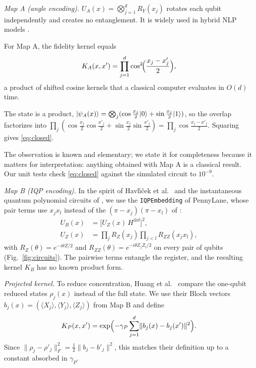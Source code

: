 \emph{Map A (angle encoding).} $U_A(x)=\bigotimes_{j=1}^{d}R_Y(x_j)$ rotates each qubit independently
and creates no entanglement. It is widely used in hybrid NLP models \cite{vats2025survey}.

\begin{proposition}
\label{prop:angle}
For Map A, the fidelity kernel equals
\begin{equation}
K_A(x,x') = \prod_{j=1}^{d}\cos^2\!\Bigl(\frac{x_j-x'_j}{2}\Bigr),
\label{eq:closed}
\end{equation}
a product of shifted cosine kernels that a classical computer evaluates in $O(d)$ time.
\end{proposition}
\begin{paperproof}
The state is a product, $\lvert \psi_A(x) \rangle=\bigotimes_j(\cos\frac{x_j}{2}\lvert 0 \rangle+\sin\frac{x_j}{2}\lvert 1 \rangle)$, so the
overlap factorizes into $\prod_j(\cos\frac{x_j}{2}\cos\frac{x'_j}{2}+\sin\frac{x_j}{2}\sin\frac{x'_j}{2})
=\prod_j\cos\frac{x_j-x'_j}{2}$. Squaring gives \eqref{eq:closed}.
\end{paperproof}

The observation is known and elementary; we state it for completeness because it matters for
interpretation: anything obtained with Map A is a classical result. Our unit tests check
\eqref{eq:closed} against the simulated circuit to $10^{-9}$.

\emph{Map B (IQP encoding).} In the spirit of Havl\'{\i}\v{c}ek et al.~\cite{havlicek2019supervised} and the
instantaneous quantum polynomial circuits of \cite{shepherd2009temporally}, we use the
\texttt{IQPEmbedding} of PennyLane, whose pair terms use $x_jx_l$ instead of the
$(\pi-x_j)(\pi-x_l)$ of \cite{havlicek2019supervised}:
\begin{equation}
\begin{aligned}
U_B(x)&=\bigl[U_Z(x)\,H^{\otimes d}\bigr]^{2},\\
U_Z(x)&=\prod_{j}R_Z(x_j)\prod_{j<l}R_{ZZ}(x_jx_l),
\end{aligned}
\label{eq:iqp}
\end{equation}
with $R_Z(\theta)=e^{-i\theta Z/2}$ and $R_{ZZ}(\theta)=e^{-i\theta Z_jZ_l/2}$ on every pair of qubits
(Fig.~\ref{fig:circuits}). The pairwise terms entangle the register, and the resulting kernel $K_B$ has
no known product form.

\emph{Projected kernel.} To reduce concentration, Huang et al.~\cite{huang2021power} compare the
one-qubit reduced states $\rho_j(x)$ instead of the full state. We use their Bloch vectors
$b_j(x)=(\langle X_j\rangle,\langle Y_j\rangle,\langle Z_j\rangle)$ from Map B and define
\begin{equation}
K_P(x,x')=\exp\Bigl(-\gamma_P\sum_{j=1}^{d}\lVert b_j(x)-b_j(x')\rVert^2\Bigr).
\label{eq:proj}
\end{equation}
Since $\lVert\rho_j-\rho'_j\rVert_F^2=\tfrac12\lVert b_j-b'_j\rVert^2$, this matches their definition up
to a constant absorbed in $\gamma_P$.

